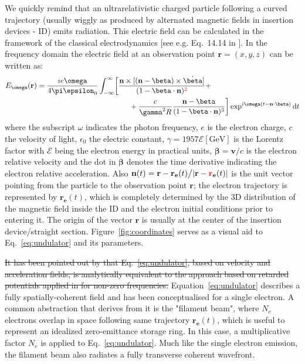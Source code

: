 \documentclass{iucr}              %
\newcommand{\remove}[1]{ {\color{blue} \sout{#1}}}
\newcommand{\inred}[1]{{\color{red}#1}}
\begin{document}
We quickly remind that an ultrarelativistic charged particle following a curved trajectory (usually wiggly as produced by alternated magnetic fields in insertion devices - ID) emits radiation. This electric field can be calculated in the framework of the classical electrodynamics [see e.g. Eq.~14.14 in \cite{jackson}]. In the frequency domain the electric field at an observation point $\textbf{r}=(x,y,z)$ can be written as: 
\begin{equation}
\begin{split}
    E_{\omega}(\textbf{r}) = \frac{i e \omega}{4 \pi \epsilon_0} 
    \int_{-\infty}^{\infty}
    &\biggl[ 
    \frac{\textbf{n} \times [(\textbf{n} - \mathbf{\beta}) \times \dot{\mathbf{\beta}}]}
    {(1- \mathbf{\beta} \cdot \textbf{n})^\inred{2}} +\\
    &\qquad+\frac{c}{\gamma^2 R}   \frac{\textbf{n} - \mathbf{\beta}}{(1-\mathbf{\beta} \cdot \textbf{n})^3} \biggr]
    \exp^{i \omega (t - \textbf{n}\cdot\mathbf{\beta})} \mathrm{d}t
\end{split}\label{eq:undulator}
\end{equation}
where the subscript $\omega$ indicates the photon frequency, $e$ is the electron charge, $c$ the velocity of light, $\epsilon_0$ the electric constant, $\gamma=1957\mathcal{E}[\mathrm{GeV}]$ is the Lorentz factor with $\mathcal{E}$ being the electron energy in practical units, $\mathbf{\beta}=\mathbf{v}\big/c$ is the electron relative velocity and the dot in $\dot{\mathbf{\beta}}$ denotes the time derivative indicating the electron relative acceleration. Also $\textbf{n}(t)=\textbf{r}-\textbf{r}_{\textbf{e}}(t)\big/|\textbf{r}-\textbf{\inred{r}}_{\textbf{e}}(t)|$ is the unit vector pointing from the particle to the observation point $\textbf{r}$; the electron trajectory is represented by $\textbf{r}_{\textbf{e}}(t)$, which is completely determined by the 3D distribution of the magnetic field inside the ID and the electron initial conditions prior to entering it. The origin of the vector $\textbf{r}$ is usually at the center of the insertion device/straight section. Figure~\ref{fig:coordinates} serves as a visual aid to Eq.~\ref{eq:undulator} and its parameters. 

\remove{It has been pointed out by  that Eq.~\ref{eq:undulator}, based on velocity and acceleration fields, is analytically equivalent to the approach based on retarded potentials applied in \cite{Chubar1995} for non-zero frequencies.}
Equation~\ref{eq:undulator} describes a fully spatially-coherent field and has been conceptualised for a single electron. A common abstraction that derives from it is the "filament beam", where $N_e$ electrons overlap in space following same trajectory $\textbf{r}_{\textbf{e}}(t)$, which is useful to  represent an idealized zero-emittance storage ring. In this case, a multiplicative factor $N_e$ is applied to Eq.~\ref{eq:undulator}. Much like the single electron emission, the filament beam also radiates a fully transverse coherent wavefront.
\end{document}
